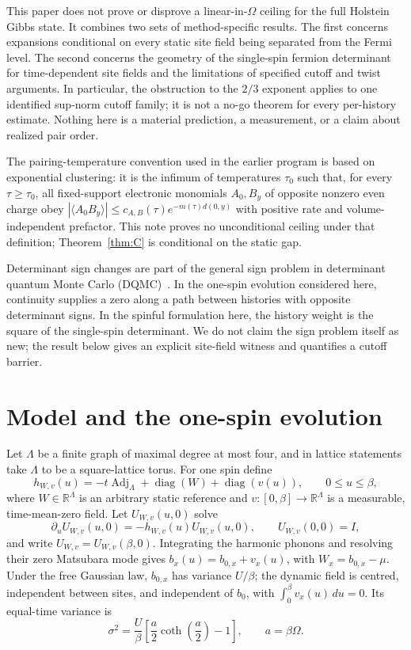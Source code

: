 \documentclass[11pt]{article}
\theoremstyle{definition}
\theoremstyle{remark}
\DeclareMathOperator{\diag}{diag}
\newcommand{\R}{\mathbb{R}}
\newcommand{\Ad}{\operatorname{Adj}}
\begin{document}
This paper does not prove or disprove a linear-in-$\Omega$ ceiling for the full Holstein Gibbs state. It combines two sets of method-specific results. The first concerns expansions conditional on every static site field being separated from the Fermi level. The second concerns the geometry of the single-spin fermion determinant for time-dependent site fields and the limitations of specified cutoff and twist arguments. In particular, the obstruction to the $2/3$ exponent applies to one identified sup-norm cutoff family; it is not a no-go theorem for every per-history estimate. Nothing here is a material prediction, a measurement, or a claim about realized pair order.

The pairing-temperature convention used in the earlier program is based on exponential clustering: it is the infimum of temperatures $\tau_0$ such that, for every $\tau\geq\tau_0$, all fixed-support electronic monomials $A_0,B_y$ of opposite nonzero even charge obey $|\langle A_0B_y\rangle|\leq c_{A,B}(\tau)e^{-m(\tau)d(0,y)}$ with positive rate and volume-independent prefactor. This note proves no unconditional ceiling under that definition; Theorem~\ref{thm:C} is conditional on the static gap.

Determinant sign changes are part of the general sign problem in determinant quantum Monte Carlo (DQMC)~\cite{loh1990}. In the one-spin evolution considered here, continuity supplies a zero along a path between histories with opposite determinant signs. In the spinful formulation here, the history weight is the square of the single-spin determinant. We do not claim the sign problem itself as new; the result below gives an explicit site-field witness and quantifies a cutoff barrier.

\section{Model and the one-spin evolution}

Let $\Lambda$ be a finite graph of maximal degree at most four, and in lattice statements take $\Lambda$ to be a square-lattice torus. For one spin define
\[
 h_{W,v}(u)=-t\Ad_\Lambda+\diag(W)+\diag(v(u)),\qquad 0\leq u\leq\beta,
\]
where $W\in\R^\Lambda$ is an arbitrary static reference and $v:[0,\beta]\to\R^\Lambda$ is a measurable, time-mean-zero field. Let $U_{W,v}(u,0)$ solve
\[
 \partial_u U_{W,v}(u,0)=-h_{W,v}(u)U_{W,v}(u,0),\qquad U_{W,v}(0,0)=I,
\]
and write $U_{W,v}=U_{W,v}(\beta,0)$. Integrating the harmonic phonons and resolving their zero Matsubara mode gives $b_x(u)=b_{0,x}+v_x(u)$, with $W_x=b_{0,x}-\mu$. Under the free Gaussian law, $b_{0,x}$ has variance $U/\beta$; the dynamic field is centred, independent between sites, and independent of $b_0$, with $\int_0^\beta v_x(u)\,du=0$. Its equal-time variance is
\begin{equation}\label{eq:sigma}
 \sigma^2=\frac{U}{\beta}\left[\frac{a}{2}\coth\left(\frac a2\right)-1\right],\qquad a=\beta\Omega.
\end{equation}
\end{document}
